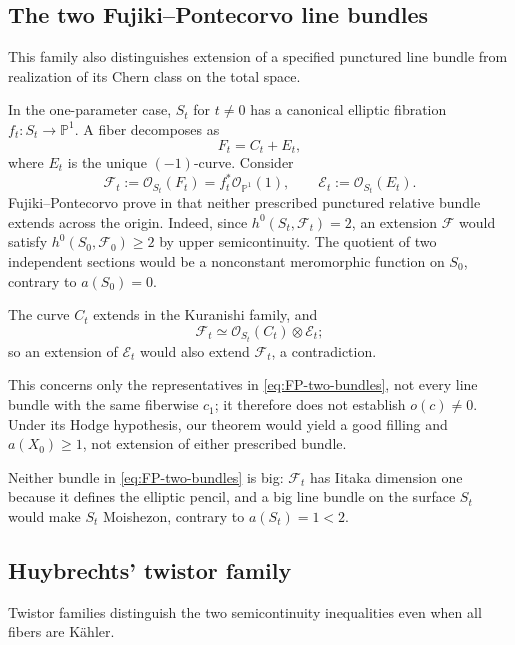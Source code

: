 \documentclass[11pt]{amsart}
\numberwithin{equation}{section}
\theoremstyle{plain}
\theoremstyle{definition}
\newcommand{\cE}{\mathcal E}
\newcommand{\cF}{\mathcal F}
\newcommand{\cO}{\mathcal O}
\begin{document}
\subsection{The two Fujiki--Pontecorvo line bundles}
\label{ss:FP-bundles}

This family also distinguishes extension of a specified punctured line
bundle from realization of its Chern class on the total space.

In the one-parameter case, $S_t$ for $t\ne0$ has a canonical elliptic
fibration $f_t:S_t\to\mathbb P^1$.  A fiber decomposes as
\begin{equation*}
 F_t=C_t+E_t,
\end{equation*}
where $E_t$ is the unique $(-1)$-curve.  Consider
\begin{equation}\label{eq:FP-two-bundles}
 \cF_t:=\cO_{S_t}(F_t)=f_t^*\cO_{\mathbb P^1}(1),
 \qquad \cE_t:=\cO_{S_t}(E_t).
\end{equation}
Fujiki--Pontecorvo prove in \cite[Remark~3.2.(2)]{FP10} that neither
prescribed punctured relative bundle extends across the origin.
Indeed, since $h^0(S_t,\cF_t)=2$, an extension $\cF$ would satisfy
$h^0(S_0,\cF_0)\ge2$ by upper semicontinuity.  The quotient of two
independent sections would be a nonconstant meromorphic function on
$S_0$, contrary to $a(S_0)=0$.

The curve $C_t$ extends in the Kuranishi family, and
\[
 \cF_t\simeq\cO_{S_t}(C_t)\otimes\cE_t;
\]
so an extension of $\cE_t$ would also extend $\cF_t$, a contradiction.

This concerns only the representatives in \eqref{eq:FP-two-bundles}, not
every line bundle with the same fiberwise $c_1$; it therefore does not
establish $o(c)\ne0$.  Under its Hodge hypothesis, our theorem would yield
a good filling and $a(X_0)\ge1$, not extension of either prescribed bundle.

Neither bundle in \eqref{eq:FP-two-bundles} is big: $\cF_t$ has Iitaka
dimension one because it defines the elliptic pencil, and a big line bundle
on the surface $S_t$ would make $S_t$ Moishezon, contrary to
$a(S_t)=1<2$.

\subsection{Huybrechts' twistor family}
\label{ss:twistor-family}

Twistor families distinguish the two semicontinuity inequalities even
when all fibers are K\"ahler.
\end{document}
